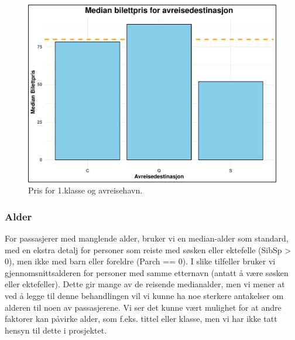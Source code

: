 \documentclass[
]{article}
\begin{document}
\begin{figure}[H]

{\centering \includegraphics[width=0.8\linewidth]{presentation_files/figure-latex/unnamed-chunk-4-1} 

}

\caption{Pris for 1.klasse og avreisehavn.}\label{fig:unnamed-chunk-4}
\end{figure}

\subsubsection{Alder}\label{alder}

For passasjerer med manglende alder, bruker vi en median-alder som
standard, med en ekstra detalj for personer som reiste med søsken eller
ektefelle (SibSp \textgreater{} 0), men ikke med barn eller foreldre
(Parch == 0). I slike tilfeller bruker vi gjennomsnittsalderen for
personer med samme etternavn (antatt å være søsken eller ektefeller).
Dette gir mange av de reisende medianalder, men vi mener at ved å legge
til denne behandlingen vil vi kunne ha noe sterkere antakelser om
alderen til noen av passasjerene. Vi ser det kunne vært mulighet for at
andre faktorer kan påvirke alder, som f.eks. tittel eller klasse, men vi
har ikke tatt hensyn til dette i prosjektet.
\end{document}

